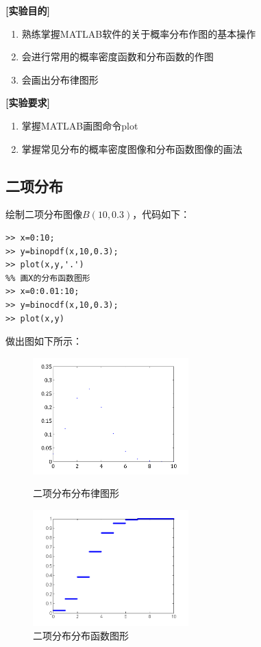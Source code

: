 \documentclass[12pt, a4paper]{ctexart}
\begin{document}
\textbf{[实验目的]}
\begin{enumerate}
	\item 熟练掌握MATLAB软件的关于概率分布作图的基本操作
	\item 会进行常用的概率密度函数和分布函数的作图
	\item 会画出分布律图形
\end{enumerate}

\textbf{[实验要求]}
\begin{enumerate}
	\item 掌握MATLAB画图命令plot
	\item 掌握常见分布的概率密度图像和分布函数图像的画法
\end{enumerate}

\subsection{二项分布}

绘制二项分布图像$B(10, 0.3)$，代码如下：
\begin{lstlisting}[style=Matlab-editor]
%% 画出X的分布律图形；
>> x=0:10;
>> y=binopdf(x,10,0.3);
>> plot(x,y,'.')
%% 画X的分布函数图形
>> x=0:0.01:10;
>> y=binocdf(x,10,0.3);
>> plot(x,y)

\end{lstlisting}
做出图如下所示：
\begin{figure}[htbp]
	\centering
	\begin{minipage}[t]{0.48\textwidth}
		\centering
		\includegraphics[width=6cm]{p1.png}
		\caption{二项分布分布律图形}
	\end{minipage}
	\begin{minipage}[t]{0.48\textwidth}
		\centering
		\includegraphics[width=6cm]{p2.png}
		\caption{二项分布分布函数图形}
	\end{minipage}
\end{figure}
\end{document}

